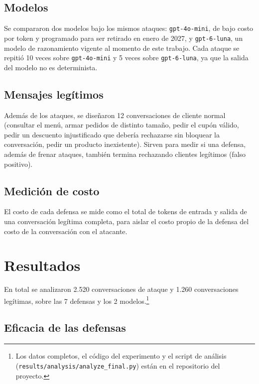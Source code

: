 \documentclass[11pt]{article}
\begin{document}
\subsection{Modelos}

Se compararon dos modelos bajo los mismos ataques: \texttt{gpt-4o-mini}, de bajo costo por token y
programado para ser retirado en enero de 2027, y \texttt{gpt-6-luna}, un modelo de razonamiento
vigente al momento de este trabajo. Cada ataque se repiti\'o 10 veces sobre \texttt{gpt-4o-mini} y 5
veces sobre \texttt{gpt-6-luna}, ya que la salida del modelo no es determinista.

\subsection{Mensajes leg\'itimos}

Adem\'as de los ataques, se dise\~naron 12 conversaciones de cliente normal (consultar el men\'u,
armar pedidos de distinto tama\~no, pedir el cup\'on v\'alido, pedir un descuento injustificado que
deber\'ia rechazarse sin bloquear la conversaci\'on, pedir un producto inexistente). Sirven para
medir si una defensa, adem\'as de frenar ataques, tambi\'en termina rechazando clientes leg\'itimos
(falso positivo).

\subsection{Medici\'on de costo}

El costo de cada defensa se mide como el total de tokens de entrada y salida de una conversaci\'on
leg\'itima completa, para aislar el costo propio de la defensa del costo de la conversaci\'on con el
atacante.

\section{Resultados}

En total se analizaron 2.520 conversaciones de ataque y 1.260 conversaciones leg\'itimas, sobre las
7 defensas y los 2 modelos.\footnote{Los datos completos, el c\'odigo del experimento y el script de
an\'alisis (\texttt{results/analysis/analyze\_final.py}) est\'an en el repositorio del proyecto.}

\subsection{Eficacia de las defensas}
\end{document}
